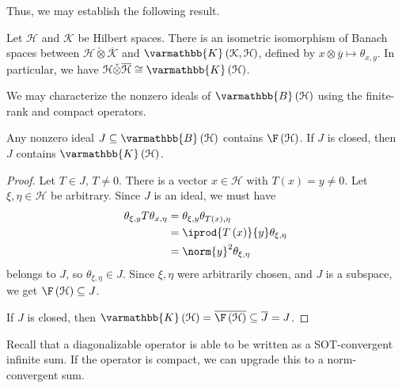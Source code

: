 \documentclass[10pt]{mypackage}
\renewcommand*{\mathbb}[1]{\varmathbb{#1}}
\newcommand{\K}{\mathbb{K}}
\newcommand{\B}{\mathbb{B}}
\begin{document}
Thus, we may establish the following result.
\begin{corollary}
  Let $\mathcal{H}$ and $\mathcal{K}$ be Hilbert spaces. There is an isometric isomorphism of Banach spaces between $\mathcal{H}\check{\otimes} \overline{\mathcal{K}}$ and $\K\left(\mathcal{K},\mathcal{H}\right)$, defined by $x\otimes \overline{y} \mapsto \theta_{x,y}$. In particular, we have $\mathcal{H}\check{\otimes}\overline{\mathcal{H}} \cong \K\left(\mathcal{H}\right)$.
\end{corollary}
We may characterize the nonzero ideals of $\B\left(\mathcal{H}\right)$ using the finite-rank and compact operators.
\begin{proposition}
  Any nonzero ideal $J\subseteq \B\left(\mathcal{H}\right)$ contains $\F\left(\mathcal{H}\right)$. If $J$ is closed, then $J$ contains $\K\left(\mathcal{H}\right)$.
\end{proposition}
\begin{proof}
  Let $T\in J$, $T\neq 0$. There is a vector $x\in \mathcal{H}$ with $T\left(x\right) = y \neq 0$. Let $\xi,\eta\in \mathcal{H}$ be arbitrary. Since $J$ is an ideal, we must have
  \begin{align*}
    \theta_{\xi,y}T\theta_{x,\eta} &= \theta_{\xi,y}\theta_{T\left(x\right),\eta}\\
                                   &= \iprod{T\left(x\right)}{y}\theta_{\xi,\eta}\\
                                   &= \norm{y}^2\theta_{\xi,\eta}
  \end{align*}
  belongs to $J$, so $\theta_{\xi,\eta}\in J$. Since $\xi,\eta$ were arbitrarily chosen, and $J$ is a subspace, we get $\F\left(\mathcal{H}\right)\subseteq J$.\newline

  If $J$ is closed, then $\K\left(\mathcal{H}\right) = \overline{\F\left(\mathcal{H}\right)} \subseteq \overline{J} = J$.
\end{proof}
Recall that a diagonalizable operator is able to be written as a SOT-convergent infinite sum. If the operator is compact, we can upgrade this to a norm-convergent sum.
\end{document}
